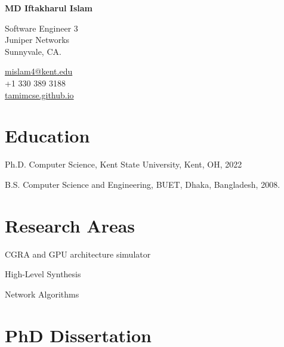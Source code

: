 \documentclass[11pt,letterpaper]{report}
\newcommand{\myname}{MD Iftakharul Islam}
\newcommand{\namefont}[1]{{\normalfont\bfseries\Huge{#1}}}
\newcommand{\listitemspace}{0.25em}
\renewenvironment{itemize}
{\begin{list}{}{\setlength{\leftmargin}{0em}
                \setlength{\parskip}{0em}
                \setlength{\itemsep}{\listitemspace}
                \setlength{\parsep}{\listitemspace}}}
{\end{list}}
\begin{document}
    \raggedright{}

    \namefont{\myname}

    \vspace{1em}
    \begin{minipage}[t]{0.700\textwidth}
        Software Engineer 3 \\
        Juniper Networks \\
        Sunnyvale, CA.
    \end{minipage}
    \begin{minipage}[t]{0.295\textwidth}
        \flushright{}
        \href{mailto:mislam4@kent.edu}{mislam4@kent.edu} \\
        +1 330 389 3188 \\
        \href{https://tamimcse.github.io/}{tamimcse.github.io}
    \end{minipage}


    \section*{Education}

    \begin{tablist}

        \item[Ph.D.] \tab{}Computer Science, Kent State University, Kent, OH, 2022
        \item[B.S.]  \tab{}Computer Science and Engineering, BUET, Dhaka, Bangladesh, 2008.

    \end{tablist}


    \section*{Research Areas}

    \begin{itemize}

        \item CGRA and GPU architecture simulator
        \item High-Level Synthesis
        \item Network Algorithms

    \end{itemize}

    \section*{PhD Dissertation}
\end{document}
